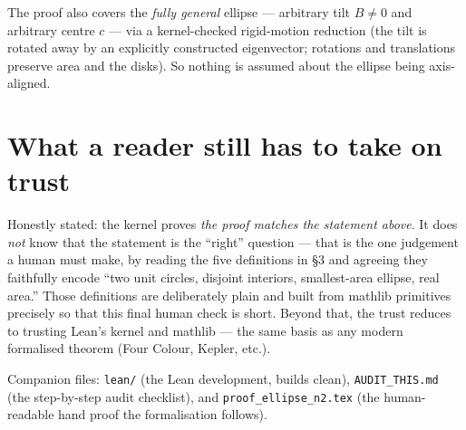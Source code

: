 \documentclass[11pt]{article}
\begin{document}
The proof also covers the \emph{fully general} ellipse --- arbitrary tilt $B\neq0$ and arbitrary
centre $c$ --- via a kernel-checked rigid-motion reduction (the tilt is rotated away by an explicitly
constructed eigenvector; rotations and translations preserve area and the disks). So nothing is
assumed about the ellipse being axis-aligned.

\section{What a reader still has to take on trust}

Honestly stated: the kernel proves \emph{the proof matches the statement above}. It does \emph{not}
know that the statement is the ``right'' question --- that is the one judgement a human must make, by
reading the five definitions in \S3 and agreeing they faithfully encode ``two unit circles, disjoint
interiors, smallest-area ellipse, real area.'' Those definitions are deliberately plain and built from
mathlib primitives precisely so that this final human check is short. Beyond that, the trust reduces to
trusting Lean's kernel and mathlib --- the same basis as any modern formalised theorem (Four Colour,
Kepler, etc.).

\vfill
\noindent\footnotesize Companion files: \texttt{lean/} (the Lean development, builds clean),
\texttt{AUDIT\_THIS.md} (the step-by-step audit checklist), and
\texttt{proof\_ellipse\_n2.tex} (the human-readable hand proof the formalisation follows).
\end{document}
